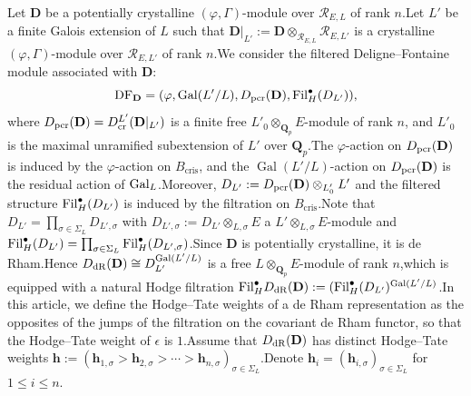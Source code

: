 \documentclass[10pt]{article}
\DeclareMathOperator{\Gal}{Gal}
\newcommand{\ccyc}{{\epsilon}}
\newcommand{\gal}{{\rm Gal}}
\newcommand{\pcr}{{\rm pcr}}
\newcommand{\fil}{{\rm Fil}}
\newcommand{\df}{{\mathrm{DF}}}
\newcommand{\dr}{{\rm dR}}
\newcommand{\hpi}{{{\mathbf{h}}}}
\newcommand{\Dpik}{{\mathbf{D}}}
\newcommand{\bQ}{{\mathbf{Q}}}
\newcommand{\bh}{{\mathbf{h}}}
\newcommand{\cR}{\mathcal R}
\begin{document}




Let $\Dpik$ be a potentially crystalline $(\varphi,\Gamma)$-module over $\cR_{E,L}$ of rank $n$.\;Let $L'$ be a finite Galois extension of $L$ such that $\Dpik|_{L'}:=\Dpik\otimes_{\cR_{E,L}}\cR_{E,L'}$ is a crystalline $(\varphi,\Gamma)$-module over $\cR_{E,L'}$ of rank $n$.\;We consider the filtered  Deligne--Fontaine module associated with $\Dpik$:
\[\df_{\Dpik}=(\varphi,\Gal(L'/L),D_{\pcr}(\Dpik),\fil_H^{\bullet}(D_{L'})),\]
where $D_{\pcr}(\Dpik)=D_{\mathrm{cr}}^{L'}(\Dpik|_{L'})$ is a finite free $L'_0\otimes_{\bQ_p}E$-module of rank $n$, and $L'_0$ is the maximal unramified subextension of $L'$ over $\bQ_p$.\;The $\varphi$-action on $D_{\pcr}(\Dpik)$ is induced by the $\varphi$-action on $B_{\mathrm{cris}}$, and the $\Gal(L'/L)$-action on $D_{\pcr}(\Dpik)$ is the residual action of $\gal_L$.\;Moreover, $D_{L'}:=D_{\pcr}(\Dpik)\otimes_{L_0'}L'$ and the  filtered structure $\fil_H^{\bullet}(D_{L'})$ is  induced by the filtration on $B_{\mathrm{cris}}$.\;Note that $D_{L'}=\prod_{\sigma\in \Sigma_L}D_{L',\sigma}$ with $D_{L',\sigma}:=D_{L'}\otimes_{L,\sigma}E$ a $L'\otimes_{L,\sigma}E$-module  and $\fil_H^{\bullet}(D_{L'})=\prod_{\sigma\in \Sigma_L}\fil_H^{\bullet}(D_{L',\sigma})$.\;Since $\Dpik$ is potentially crystalline, it is de Rham.\;Hence $D_{\dr}(\Dpik)\cong D_{L'}^{\Gal(L'/L)}$ is a free $L\otimes_{\bQ_p}E$-module of rank $n$,\;which  is equipped with a natural Hodge filtration  $\fil^{\bullet}_{H}D_{\dr}(\Dpik):=(\fil^{\bullet}_{H}(D_{L'})^{\Gal(L'/L)}$.\;In this article, we define the Hodge--Tate weights of a de Rham representation as the opposites of the jumps of the filtration on the covariant de Rham functor, so that the Hodge--Tate weight of ${\ccyc}$ is $1$.\;Assume that $D_{\dr}(\Dpik)$ has distinct Hodge--Tate weights $\bh:=(\hpi_{1,\sigma}>\hpi_{2,\sigma}>\cdots>\hpi_{n,\sigma} )_{\sigma\in \Sigma_L}$.\;Denote $\hpi_{i}=(\hpi_{i,\sigma})_{\sigma\in \Sigma_L}$ for $1\leq i\leq n$.\;
\end{document}
